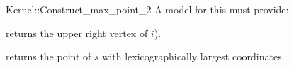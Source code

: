 \begin{ccRefFunctionObjectConcept}{Kernel::Construct_max_point_2}
A model for this must provide:


       {returns the upper right vertex of $i$).}

       {returns the point of $s$ with lexicographically largest coordinates.}

\end{ccRefFunctionObjectConcept}
